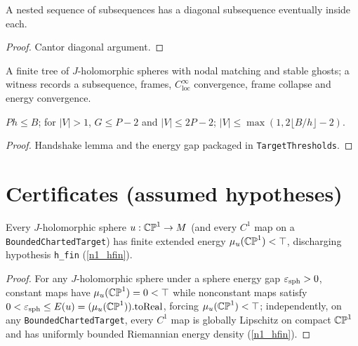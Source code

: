 \begin{lemma}
\label{lem_diagonal}
\leanok
A nested sequence of subsequences has a diagonal subsequence eventually inside each.
\end{lemma}
\begin{proof}\leanok Cantor diagonal argument.\end{proof}

\begin{definition}
\label{def_limit}
\leanok
{}
A finite tree of $J$-holomorphic spheres with nodal matching and stable ghosts; a witness records a
subsequence, frames, $C^\infty_{\mathrm{loc}}$ convergence, frame collapse and energy convergence.
\end{definition}

\begin{theorem}
\label{thm_component_bounds}
\leanok
{}
$Ph\le B$; for $|V|>1$, $G\le P-2$ and $|V|\le2P-2$; $|V|\le\max(1,2\lfloor B/h\rfloor-2)$.
\end{theorem}
\begin{proof}\leanok Handshake lemma and the energy gap packaged in \texttt{TargetThresholds}.\end{proof}

\chapter{Certificates (assumed hypotheses)}
\label{chap_certificates}

\begin{theorem}
\label{cert_fin}
\leanok
{}
Every $J$-holomorphic sphere $u:\mathbb{CP}^1\to M$ (and every $C^1$ map on a \texttt{BoundedChartedTarget})
has finite extended energy $\mu_u(\mathbb{CP}^1)<\top$, discharging hypothesis \texttt{h\_fin} (\cref{n1_hfin}).
\end{theorem}
\begin{proof}\leanok For any $J$-holomorphic sphere under a sphere energy gap $\varepsilon_{\mathrm{sph}}>0$,
constant maps have $\mu_u(\mathbb{CP}^1)=0<\top$ while nonconstant maps satisfy
$0<\varepsilon_{\mathrm{sph}}\le E(u)=(\mu_u(\mathbb{CP}^1)).\mathrm{toReal}$, forcing $\mu_u(\mathbb{CP}^1)<\top$; independently,
on any \texttt{BoundedChartedTarget}, every $C^1$ map is globally Lipschitz on compact $\mathbb{CP}^1$ and has
uniformly bounded Riemannian energy density (\cref{n1_hfin}).\end{proof}

